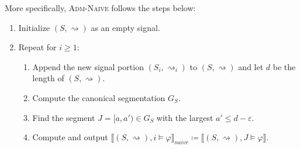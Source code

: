 \documentclass[iicol,lineno]{sn-jnl}
\renewcommand{\pfx}{\textsf{prefix}}
\newcommand{\hb}{\rightsquigarrow}
\newcommand{\?}{\text{?}}
\newcommand{\defeq}{\coloneqq}
\begin{document}
	More specifically, \textsc{Adm-Naive} follows the steps below:
	\begin{enumerate}[label*=\arabic*.]
		\item Initialize $(S,{\hb})$ as an empty signal.
		\item Repeat for $i \geq 1$:
		\begin{enumerate}[leftmargin=5pt,label*=\arabic*]
			\item Append the new signal portion $(S_i,{\hb}_i)$ to $(S,{\hb})$ and let $d$ be the length of $(S,{\hb})$.
			\item Compute the canonical segmentation $G_S$.
			\item Find the segment $J = [a, a') \in G_S$ with the largest $a' \leq d-\varepsilon$.
			\item Compute and output  $\llbracket (S, {\hb}), i \models \varphi \rrbracket_{\textit{naive}} \defeq \llbracket (S, {\hb}), J \models \varphi \rrbracket$.
		\end{enumerate}
	\end{enumerate}
\end{document}
